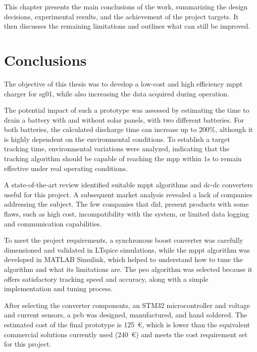 \label{chap:Conclusion}

This chapter presents the main conclusions of the work, summarizing the design decisions, experimental results, and the achievement of the project targets.
It then discusses the remaining limitations and outlines what can still be improved.


\section{Conclusions}

The objective of this thesis was to develop a low-cost and high efficiency \ac{mppt} charger for \ac{sg01}, while also increasing the data acquired during operation. 

The potential impact of such a prototype was assessed by estimating the time to drain a battery with and without solar panels, with two different batteries. For both batteries, the calculated discharge time can increase up to 200\%, although it is highly dependent on the environmental conditions. To establish a target tracking time, environmental variations were analyzed, indicating that the tracking algorithm should be capable of reaching the \ac{mpp} within $1\mathrm{s}$ to remain effective under real operating conditions.

A state-of-the-art review identified suitable \ac{mppt} algorithms and \acs{dc}-\acs{dc} converters useful for this project. A subsequent market analysis revealed a lack of companies addressing the subject. The few companies that did, present products with some flaws, such as high cost, incompatibility with the system, or limited data logging and communication capabilities.

To meet the project requirements, a synchronous boost converter was carefully dimensioned and validated in LTspice simulations, while the \ac{mppt} algorithm was developed in MATLAB Simulink, which helped to understand how to tune the algorithm and what its limitations are. The \ac{peo} algorithm was selected because it offers satisfactory tracking speed and accuracy, along with a simple implementation and tuning process.

After selecting the converter components, an STM32 microcontroller and voltage and current sensors, a \ac{pcb} was designed, manufactured, and hand soldered.
The estimated cost of the final prototype is 125~€, which is lower than the equivalent commercial solutions currently used (240~€) and meets the cost requirement set for this project.

